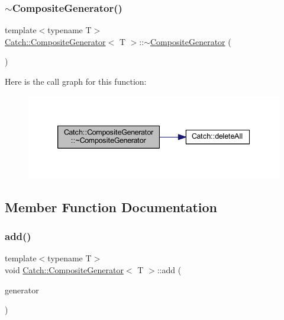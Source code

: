 \subsubsection{\texorpdfstring{$\sim$\+Composite\+Generator()}{~CompositeGenerator()}}
{\footnotesize\ttfamily template$<$typename T$>$ \\
\hyperlink{class_catch_1_1_composite_generator}{Catch\+::\+Composite\+Generator}$<$ T $>$\+::$\sim$\hyperlink{class_catch_1_1_composite_generator}{Composite\+Generator} (\begin{DoxyParamCaption}{ }\end{DoxyParamCaption})\hspace{0.3cm}{\ttfamily [inline]}}

Here is the call graph for this function\+:\nopagebreak
\begin{figure}[H]
\begin{center}
\leavevmode
\includegraphics[width=339pt]{class_catch_1_1_composite_generator_a5766205abd7004c508c20ddbb5e5555e_cgraph}
\end{center}
\end{figure}


\subsection{Member Function Documentation}
\hypertarget{class_catch_1_1_composite_generator_af3774d42ad2d3453d089ca599efe0517}{}\label{class_catch_1_1_composite_generator_af3774d42ad2d3453d089ca599efe0517} 
\subsubsection{\texorpdfstring{add()}{add()}}
{\footnotesize\ttfamily template$<$typename T$>$ \\
void \hyperlink{class_catch_1_1_composite_generator}{Catch\+::\+Composite\+Generator}$<$ T $>$\+::add (\begin{DoxyParamCaption}\item[{const \hyperlink{struct_catch_1_1_i_generator}{I\+Generator}$<$ T $>$ $\ast$}]{generator }\end{DoxyParamCaption})\hspace{0.3cm}{\ttfamily [inline]}}

